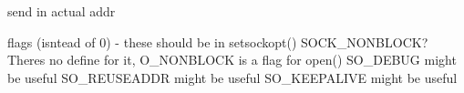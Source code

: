 
\begin{DoxyRefList}
\item[Member \mbox{\hyperlink{classHttpServer_abc9a3cc68d320d89544a257da11148d0}{Http\+Server\+::create\+Socket}} ()]\label{todo__todo000001}%
%
send in actual addr  
\item[Member \mbox{\hyperlink{classTcpSocket_a132aa72af141d611f8bad96ba585a79f}{Tcp\+Socket\+::Tcp\+Socket}} ()]\label{todo__todo000005}%
%
flags (isntead of 0) -\/ these should be in setsockopt() SOCK\+\_\+\+NONBLOCK? There\textquotesingle{}s no define for it, O\+\_\+\+NONBLOCK is a flag for open() SO\+\_\+\+DEBUG might be useful SO\+\_\+\+REUSEADDR might be useful SO\+\_\+\+KEEPALIVE might be useful 
\end{DoxyRefList}